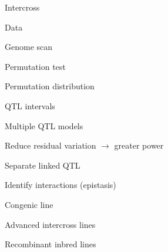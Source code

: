 \documentclass[aspectratio=169,12pt,t]{beamer}
\begin{document}
\begin{frame}[c]{Intercross}
\end{frame}


\begin{frame}[c]{Data}
\end{frame}



\begin{frame}[c]{Genome scan}
\bigskip



\end{frame}



\begin{frame}[c]{Permutation test}


\end{frame}


\begin{frame}[c]{Permutation distribution}


\end{frame}



\begin{frame}[c]{QTL intervals}


\end{frame}



\begin{frame}{Multiple QTL models}

  \bbi
\item Reduce residual variation $\longrightarrow$ greater power
\item Separate linked QTL
\item Identify interactions {\lolit (epistasis)}
  \ei

\end{frame}


\begin{frame}[c]{Congenic line}
\end{frame}

\begin{frame}[c]{Advanced intercross lines}
\end{frame}


\begin{frame}[c]{Recombinant inbred lines}
\end{frame}
\end{document}

